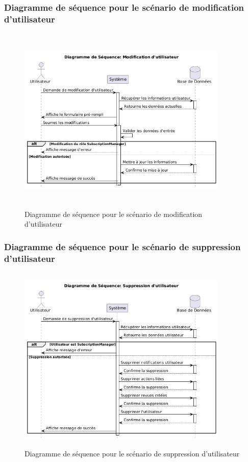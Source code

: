 \subsubsection{Diagramme de séquence pour le scénario de modification d'utilisateur}
\begin{figure}[H]
    \centering
    \includegraphics[width=10cm,height=9cm]{images/modifyusersq.png}
    \caption{Diagramme de séquence pour le scénario de modification d'utilisateur}
\end{figure}

\subsubsection{Diagramme de séquence pour le scénario de suppression d'utilisateur}
\begin{figure}[H]
    \centering
    \includegraphics[width=10cm,height=9cm]{images/suppressionutilisateursq.png}
    \caption{Diagramme de séquence pour le scénario de suppression d'utilisateur}
\end{figure}

